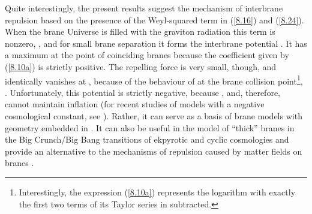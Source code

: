 \documentclass[a4paper,preprint,nofootinbib,
                 showpacs,preprintnumbers,amsmath,amssymb]{revtex4}
\begin{document}
Quite interestingly, the  
present results suggest the mechanism of interbrane repulsion 
based on the presence of the Weyl-squared term in (\ref{8.16}) and  
(\ref{8.24}). When the brane Universe is filled with the graviton 
radiation this term is nonzero, \coordHE{},  
and for small brane separation it forms the interbrane potential 
\coordHE{}. It has a maximum 
at the point of coinciding branes \coordHE{} because the coefficient 
\coordHE{} given by (\ref{8.10a}) is strictly positive. The 
repelling force is very small, though, and identically vanishes  
at \coordHE{}, because of the behaviour of \coordHE{} at the brane 
collision point\footnote{Interestingly, the expression (\ref{8.10a}) 
represents  the logarithm \coordHE{} with exactly  
the first two terms of its Taylor series in \coordHE{}  
subtracted.}, \coordHE{}. Unfortunately, this 
potential is strictly negative, because \coordHE{}, and,  
therefore, cannot maintain  
inflation (for recent studies of models with a negative cosmological  
constant, see \cite{FFKL}). Rather, it can serve as a basis of brane 
models with \coordHE{} geometry embedded in \coordHE{} \cite{AdS_4brane}. 
It can also be useful in the model of ``thick'' branes in the  
Big Crunch/Big Bang transitions \cite{TurToll} of ekpyrotic and 
cyclic cosmologies \cite{Ekpyr,cycle} and provide an alternative  
to the mechanisms of repulsion caused by matter fields on branes  
\cite{Wiseman}. 
 
\end{document}
